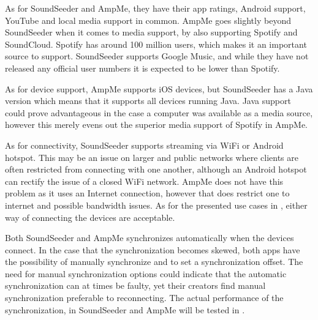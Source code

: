 As for SoundSeeder and AmpMe, they have their app ratings, Android support, YouTube and local media support in common.
AmpMe goes slightly beyond SoundSeeder when it comes to media support, by also supporting Spotify and SoundCloud.
Spotify has around 100 million users, which makes it an important source to support\cite{spotify_subscribers}.
SoundSeeder supports Google Music, and while they have not released any official user numbers it is expected to be lower than Spotify\cite{googlem_subscribers}.

As for device support, AmpMe supports iOS devices, but SoundSeeder has a Java version which means that it supports all devices running Java.
Java support could prove advantageous in the case a computer was available as a media source, however this merely evens out the superior media support of Spotify in AmpMe.

As for connectivity, SoundSeeder supports streaming via WiFi or Android hotspot.
This may be an issue on larger and public networks where clients are often restricted from connecting with one another, although an Android hotspot can rectify the issue of a closed WiFi network.
AmpMe does not have this problem as it uses an Internet connection, however that does restrict one to internet and possible bandwidth issues.
As for the presented use cases in , either way of connecting the devices are acceptable.

Both SoundSeeder and AmpMe synchronizes automatically when the devices connect.
In the case that the synchronization becomes skewed, both apps have the possibility of manually synchronize and to set a synchronization offset.
The need for manual synchronization options could indicate that the automatic synchronization can at times be faulty, yet their creators find manual synchronization preferable to reconnecting.
The actual performance of the synchronization, in SoundSeeder and AmpMe will be tested in .

